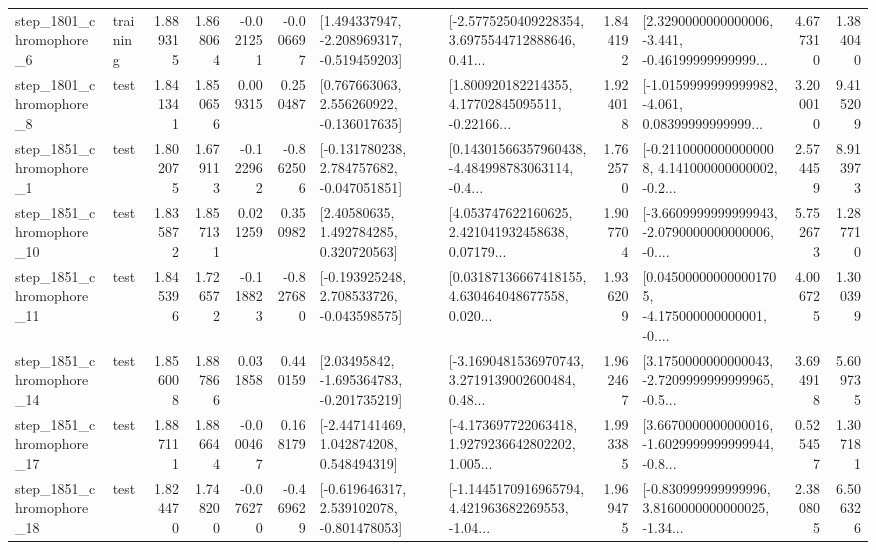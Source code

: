 \begin{tabular}{llrrrrllrlrr}
  step\_1801\_chromophore\_6 &  training &      1.889315 &    1.868064 &     -0.021251 & -0.006697 &   [1.494337947, -2.208969317, -0.519459203] &  [-2.5775250409228354, 3.6975544712888646, 0.41... &       1.844192 &  [2.3290000000000006, -3.441, -0.46199999999999... &            4.677310 &          1.384040 \\
  step\_1801\_chromophore\_8 &      test &      1.841341 &    1.850656 &      0.009315 &  0.250487 &    [0.767663063, 2.556260922, -0.136017635] &  [1.800920182214355, 4.17702845095511, -0.22166... &       1.924018 &  [-1.0159999999999982, -4.061, 0.08399999999999... &            3.200010 &          9.415209 \\
  step\_1851\_chromophore\_1 &      test &      1.802075 &    1.679113 &     -0.122962 & -0.862506 &   [-0.131780238, 2.784757682, -0.047051851] &  [0.14301566357960438, -4.484998783063114, -0.4... &       1.762570 &  [-0.21100000000000008, 4.141000000000002, -0.2... &            2.574459 &          8.913973 \\
 step\_1851\_chromophore\_10 &      test &      1.835872 &    1.857131 &      0.021259 &  0.350982 &      [2.40580635, 1.492784285, 0.320720563] &  [4.053747622160625, 2.421041932458638, 0.07179... &       1.907704 &  [-3.6609999999999943, -2.0790000000000006, -0.... &            5.752673 &          1.287710 \\
 step\_1851\_chromophore\_11 &      test &      1.845396 &    1.726572 &     -0.118823 & -0.827680 &   [-0.193925248, 2.708533726, -0.043598575] &  [0.03187136667418155, 4.630464048677558, 0.020... &       1.936209 &  [0.045000000000001705, -4.175000000000001, -0.... &            4.006725 &          1.300399 \\
 step\_1851\_chromophore\_14 &      test &      1.856008 &    1.887866 &      0.031858 &  0.440159 &    [2.03495842, -1.695364783, -0.201735219] &  [-3.1690481536970743, 3.2719139002600484, 0.48... &       1.962467 &  [3.1750000000000043, -2.7209999999999965, -0.5... &            3.694918 &          5.609735 \\
 step\_1851\_chromophore\_17 &      test &      1.887111 &    1.886644 &     -0.000467 &  0.168179 &    [-2.447141469, 1.042874208, 0.548494319] &  [-4.173697722063418, 1.9279236642802202, 1.005... &       1.993385 &  [3.6670000000000016, -1.6029999999999944, -0.8... &            0.525457 &          1.307181 \\
 step\_1851\_chromophore\_18 &      test &      1.824470 &    1.748200 &     -0.076270 & -0.469629 &   [-0.619646317, 2.539102078, -0.801478053] &  [-1.1445170916965794, 4.421963682269553, -1.04... &       1.969475 &  [-0.830999999999996, 3.8160000000000025, -1.34... &            2.380805 &          6.506326 \\

\end{tabular}
